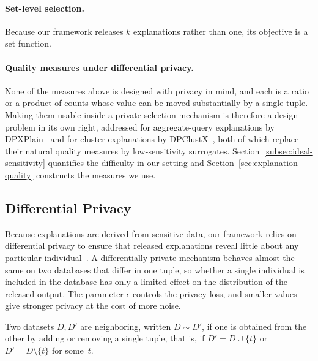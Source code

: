 \paragraph{Set-level selection.}
Because our framework releases $k$ explanations rather than one, its objective is a
set function.

\paragraph{Quality measures under differential privacy.}
None of the measures above is designed with privacy in mind, and each is a ratio or
a product of counts whose value can be moved substantially by a single tuple.
Making them usable inside a private selection mechanism is therefore a design
problem in its own right, addressed for aggregate-query explanations by
DPXPlain~\cite{TaoGMR22} and for cluster explanations by
DPClustX~\cite{DPClustX}, both of which replace their natural quality measures by
low-sensitivity surrogates.
Section~\ref{subsec:ideal-sensitivity} quantifies the difficulty in our setting and
Section~\ref{sec:explanation-quality} constructs the measures we use.

\subsection{Differential Privacy}
\label{subsec:prelim-dp}
Because explanations are derived from sensitive data, our framework relies on
differential privacy to ensure that released explanations reveal little about any
particular individual~\cite{TheAlgFoundDP2014}. A differentially private mechanism
behaves almost the same on two databases that differ in one tuple, so whether a
single individual is included in the database has only a limited effect on the
distribution of the released output. The parameter $\epsilon$ controls the privacy
loss, and smaller values give stronger privacy at the cost of more noise.

\begin{definition}
\label{def:neighboring}
Two datasets $D,D'$ are neighboring, written $D\sim D'$, if one is obtained
from the other by adding or removing a single tuple, that is, if
$D'=D\cup\{t\}$ or $D'=D\setminus\{t\}$ for some~$t$.
\end{definition}

